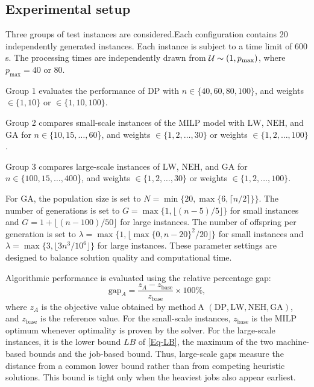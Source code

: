 ﻿\documentclass[12pt]{article} \textheight=24.5cm \textwidth=16.5cm \parskip = 0.165cm
\begin{document}
\begin{sloppypar}
        \subsection{Experimental setup} \label{sec:setup}

        Three groups of test instances are considered.Each configuration contains 20 independently generated instances.
        Each instance is subject to a time limit of 600 s.
        The processing times are independently drawn from $\mathcal{U} \thicksim (1,p_{\max})$, where $p_{\max}=40$ or $80$.

        Group 1 evaluates the performance of $\mathrm{DP}$ with $n\in\{40,60,80,100\}$, and weights $\in \{1,10\}$ or $\in \{1,10,100\}$.

        Group 2 compares small-scale instances of the $\mathrm{MILP}$ model with $\mathrm{LW}$, $\mathrm{NEH}$, and $\mathrm{GA}$ for $n\in\{10,15,\ldots,60$\}, and weights $\in \{1,2,\ldots,30\}$ or weights $\in \{1,2,\ldots,100\}$.

        Group 3 compares large-scale instances of $\mathrm{LW}$, $\mathrm{NEH}$, and $\mathrm{GA}$ for $n\in\{100,15,\ldots,400$\}, and weights $\in \{1,2,\ldots,30\}$ or weights $\in \{1,2,\ldots,100\}$.

        For $\mathrm{GA}$, the population size is set to $N=\min\{20,\max\{6,\lceil n/2\rceil\}\}$.
        The number of generations is set to $G=\max\{1,\lfloor(n-5)/5\rfloor\}$ for small instances and $G=1+\lfloor(n-100)/50\rfloor$ for large instances.
        The number of offspring per generation is set to $\lambda=\max\{1,\lfloor\max\{0,n-20\}^2/20\rfloor\}$ for small instances and $\lambda=\max\{3,\lfloor 3n^3/10^6\rfloor\}$ for large instances.
        These parameter settings are designed to balance solution quality and computational time.

        Algorithmic performance is evaluated using the relative percentage gap:
        \begin{equation}\label{eq:gap}
            \text{gap}_A =
            \frac{z_A-z_{\text{base}}}{z_{\text{base}}}\times 100\%,
        \end{equation}
        where $z_A$ is the objective value obtained by $\mathrm{method\ A}$ $( \mathrm{DP}, \mathrm{LW}, \mathrm{NEH}, \mathrm{GA})$, and $z_{\text{base}}$ is the reference value.
        For the small-scale instances, $z_{\text{base}}$ is the $\mathrm{MILP}$ optimum whenever optimality is proven by the solver.
        For the large-scale instances, it is the lower bound $LB$ of \cref{Eq-LB}, the maximum of the two machine-based bounds and the job-based bound.
        Thus, large-scale gaps measure the distance from a common lower bound rather than from competing heuristic solutions.
        This bound is tight only when the heaviest jobs also appear earliest.


\end{sloppypar}
\end{document}
